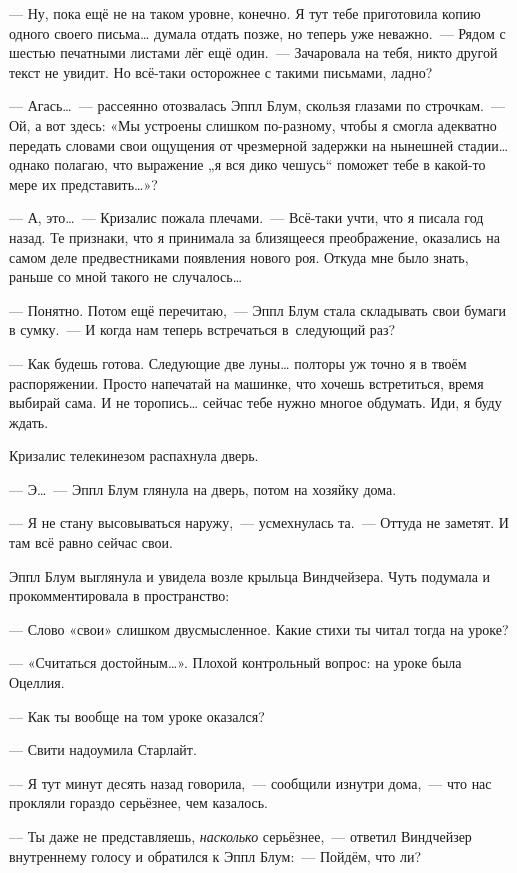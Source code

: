 \documentclass[fontsize=11pt,a5paper,titlepage=firstcover]{scrbook}
\begin{document}
--- Ну, пока ещё не на таком уровне, конечно. Я тут тебе приготовила копию одного своего письма{\ldots} думала отдать позже, но теперь уже неважно.~--- Рядом с шестью печатными листами лёг ещё один.~--- Зачаровала на тебя, никто другой текст не увидит. Но всё-таки осторожнее с такими письмами, ладно?

--- Агась{\ldots}~--- рассеянно отозвалась Эппл Блум, скользя глазами по строчкам.~--- Ой, а вот здесь: «Мы устроены слишком по-разному, чтобы я смогла адекватно передать словами свои ощущения от чрезмерной задержки на нынешней стадии{\ldots} однако полагаю, что выражение „я вся дико чешусь“ поможет тебе в какой-то мере их представить{\ldots}»?

--- А, это{\ldots}~--- Кризалис пожала плечами.~--- Всё-таки учти, что я писала год назад. Те признаки, что я принимала за близящееся преображение, оказались на самом деле предвестниками появления нового роя. Откуда мне было знать, раньше со мной такого не случалось{\ldots}

--- Понятно. Потом ещё перечитаю,~--- Эппл Блум стала складывать свои бумаги в сумку.~--- И когда нам теперь встречаться в~следующий раз?

--- Как будешь готова. Следующие две луны{\ldots} полторы уж точно я в твоём распоряжении. Просто напечатай на машинке, что хочешь встретиться, время выбирай сама. И не торопись{\ldots} сейчас тебе нужно многое обдумать. Иди, я буду ждать.

Кризалис телекинезом распахнула дверь.

--- Э{\ldots}~--- Эппл Блум глянула на дверь, потом на хозяйку дома.

--- Я не стану высовываться наружу,~--- усмехнулась та.~--- Оттуда не заметят. И там всё равно сейчас свои.

Эппл Блум выглянула и увидела возле крыльца Виндчейзера. Чуть подумала и прокомментировала в пространство:

--- Слово «свои» слишком двусмысленное. Какие стихи ты читал тогда на уроке?

--- «Считаться достойным{\ldots}». Плохой контрольный вопрос: на уроке была Оцеллия.

--- Как ты вообще на том уроке оказался?

--- Свити надоумила Старлайт.

--- Я тут минут десять назад говорила,~--- сообщили изнутри дома,~--- что нас прокляли гораздо серьёзнее, чем казалось.

--- Ты даже не представляешь, \emph{насколько} серьёзнее,~--- ответил Виндчейзер внутреннему голосу и обратился к Эппл Блум:~--- Пойдём, что ли?
\end{document}
